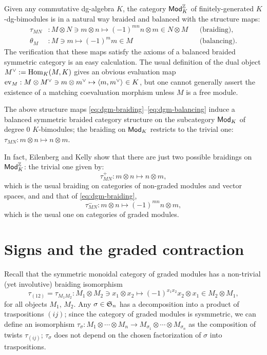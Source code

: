 Given any commutative dg-algebra $K$, the category $\mathsf{Mod}_K^{\mathbb{Z}}$ of
finitely-generated $K$-dg-bimodules is in a natural way braided and
balanced with the structure maps:
\begin{align}
  \label{eq:dgm-braiding}
  \tau_{MN} &: M \otimes N \ni m\otimes n \mapsto (-1)^{mn}n\otimes m \in N \otimes M
  &&
  \text{(braiding),}
  \\
  \label{eq:dgm-balancing}
  \theta_M &: M \ni m \mapsto (-1)^mm \in M
  &&
  \text{(balancing).}
\end{align}
The verification that these maps satisfy the axioms of a balanced
braided symmetric category is an easy calculation.  The usual
definition of the dual object $\rdl{M} := \Hom_K(M, K)$ gives an
obvious evaluation map $\ev_M : M \otimes \rdl{M} \ni m \otimes \rdl{m} \mapsto
\pairing{m}{\rdl{m}} \in K$, but one cannot generally assert the
existence of a matching coevaluation morphism unless $M$ is a free
module.

The above structure maps
\eqref{eq:dgm-braiding}--\eqref{eq:dgm-balancing} induce a balanced
symmetric braided category structure on the subcategory $\mathsf{Mod}_K$ of
degree $0$ $K$-bimodules; the braiding on $\mathsf{Mod}_K$ restricts to the
trivial one: $\tau_{MN}: m\otimes n \mapsto n\otimes m$.
\begin{remark}
  In fact, Eilenberg and Kelly \cite{eilenberg-kelly;monoidal-categories}
  show that there are just two possible braidings on $\mathsf{Mod}_K^{\mathbb{Z}}$:
  the trivial one given by:
  \begin{equation*}
    \tau_{MN}^+ : m\otimes n \mapsto n\otimes m,
  \end{equation*}
  which is the usual braiding on categories of non-graded modules and
  vector spaces, and and that of \eqref{eq:dgm-braiding},
  \begin{equation*}
    \tau_{MN}^- : m\otimes n \mapsto (-1)^{mn} n\otimes m,
  \end{equation*}
  which is the usual one on categories of graded modules.
\end{remark}


\section{Signs and the graded contraction}
\label{sec:signs}

Recall that the symmetric monoidal category of graded modules has a
non-trivial (yet involutive) braiding isomorphism
\begin{equation*}
\tau_{(12)} = \tau_{M_1M_2} : M_1
\otimes M_2 \ni x_1\otimes x_2 \mapsto (-1)^{x_1x_2} x_2\otimes x_1
\in M_2\otimes M_1,
\end{equation*}
for all objects $M_1$, $M_2$.  Any $\sigma\in\mathfrak{S}_{n}$ has a decomposition
into a product of traspositions $(ij)$; since the category of graded
modules is sysmmetric, we can define an isomorphism $\tau_\sigma: M_1 \otimes \cdots \otimes
M_n \to M_{\sigma_1} \otimes \cdots \otimes M_{\sigma_n}$ as the composition of twists $\tau_{(ij)}$;
$\tau_\sigma$ does not depend on the chosen factorization of $\sigma$ into
traspositions.

